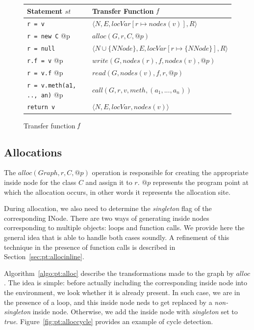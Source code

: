 \begin{figure}[h]
    \centering

    \begin{tabular}{ l | l }
        Statement $st$                & Transfer Function $\emph{f}$\\
        \hline
        \verb/r = v/                     & $\langle N, E, locVar[r \mapsto nodes(v)], R \rangle$ \\
        \verb/r = new C/ @p              & $alloc(G, r, C, @p)$ \\
        \verb/r = null/                  & $\langle N \cup \{NNode\}, E, locVar[r \mapsto \{ NNode \}], R \rangle$ \\
        \verb/r.f = v/ @p                & $write(G, nodes(r), f, nodes(v), @p)$ \\
        \verb/r = v.f/ @p                & $read(G, nodes(v), f, r, @p)$ \\
        \verb/r = v.meth(a1, .., an)/ @p & $call(G, r, v, meth, (a_1, ..., a_n))$ \\
        \verb/return v/                  & $\langle N, E, locVar, nodes(v) \rangle$ \\
    \end{tabular}

    \caption{Transfer function $\emph{f}$}
    \label{fig:pt:tf}
\end{figure}

\subsection{Allocations}
The $alloc(Graph, r, C, @p)$ operation is responsible for creating the
appropriate inside node for the class $C$ and assign it to $r$. $@p$ represents
the program point at which the allocation occurs, in other words it represents
the allocation site.

During allocation, we also need to determine the \emph{singleton} flag of the
corresponding INode. There are two ways of generating inside nodes
corresponding to multiple objects: loops and function calls. We provide here
the general idea that is able to handle both cases soundly. A refinement
of this technique in the presence of function calls is described in
Section~\ref{sec:pt:allocinline}.

Algorithm~\ref{algo:pt:alloc} describe the transformations made to the graph by
$alloc$. The idea is simple: before actually including the corresponding inside
node into the environment, we look whether it is already present. In such case,
we are in the presence of a loop, and this inside node neds to get replaced by
a \emph{non-singleton} inside node. Otherwise, we add the inside node with
\emph{singleton} set to \emph{true}. Figure~\ref{fig:pt:alloccycle} provides an
example of cycle detection.

